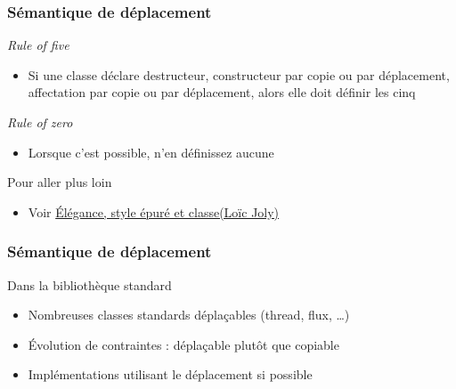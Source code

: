 \documentclass[C++.tex]{subfiles}
\begin{document}
\begin{frame}
	\frametitle{Sémantique de déplacement}
	\begin{block}{\textit{Rule of five}}
		\begin{itemize}
			\item Si une classe déclare destructeur, constructeur par copie ou par déplacement, affectation par copie ou par déplacement, alors elle doit définir les cinq

		\end{itemize}
	\end{block}

	\begin{block}{\textit{Rule of zero}}
		\begin{itemize}
			\item Lorsque c'est possible, n'en définissez aucune

		\end{itemize}
	\end{block}

	\begin{block}{Pour aller plus loin}
		\begin{itemize}
			\item Voir \href{https://github.com/cppp-france/CPPP-19/blob/master/elegance_style_epure_et_classe-Loic_Joly/elegance_style_epure_et_classe-Loic_Joly.pdf}{Élégance, style épuré et classe\linklogo (Loïc Joly)}
		\end{itemize}
	\end{block}
\end{frame}

\begin{frame}
	\frametitle{Sémantique de déplacement}
	\begin{block}{Dans la bibliothèque standard}
		\begin{itemize}
			\item Nombreuses classes standards déplaçables (thread, flux, \ldots{})


			\item Évolution de contraintes : déplaçable plutôt que copiable


			\item Implémentations utilisant le déplacement si possible
		\end{itemize}
	\end{block}
\end{frame}
\end{document}
